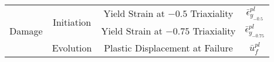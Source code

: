 \begin{table}[]
\begin{tabular}{@{}cccc@{}}
\multirow{3}{*}{Damage}  & \multirow{2}{*}{Initiation}                                                           & Yield Strain at $-0.5$ Triaxiality         & $\bar{\epsilon}^{pl}_{y_{-0.5}}$  \\
                         &                                                                                       & Yield Strain at $-0.75$ Triaxiality        & $\bar{\epsilon}^{pl}_{y_{-0.75}}$ \\ \cmidrule(lr){2-2}
                         & Evolution                                                                             & Plastic Displacement at Failure            & $\bar{u}^{pl}_f$                  \\ \bottomrule
\end{tabular}
\end{table}